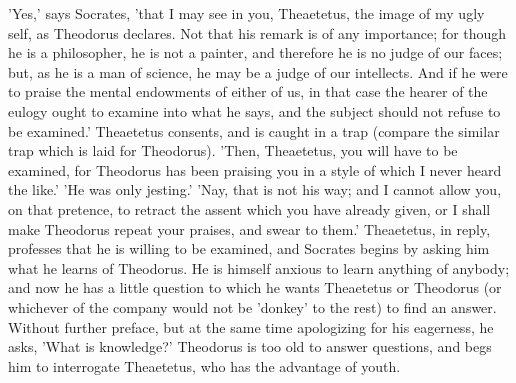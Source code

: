 'Yes,' says Socrates, 'that I may see in you, Theaetetus, the image
of my ugly self, as Theodorus declares. Not that his remark is of any
importance; for though he is a philosopher, he is not a painter, and
therefore he is no judge of our faces; but, as he is a man of science,
he may be a judge of our intellects. And if he were to praise the mental
endowments of either of us, in that case the hearer of the eulogy ought
to examine into what he says, and the subject should not refuse to be
examined.' Theaetetus consents, and is caught in a trap (compare the
similar trap which is laid for Theodorus). 'Then, Theaetetus, you will
have to be examined, for Theodorus has been praising you in a style of
which I never heard the like.' 'He was only jesting.' 'Nay, that is not
his way; and I cannot allow you, on that pretence, to retract the assent
which you have already given, or I shall make Theodorus repeat your
praises, and swear to them.' Theaetetus, in reply, professes that he is
willing to be examined, and Socrates begins by asking him what he learns
of Theodorus. He is himself anxious to learn anything of anybody; and
now he has a little question to which he wants Theaetetus or Theodorus
(or whichever of the company would not be 'donkey' to the rest) to find
an answer. Without further preface, but at the same time apologizing
for his eagerness, he asks, 'What is knowledge?' Theodorus is too old
to answer questions, and begs him to interrogate Theaetetus, who has the
advantage of youth.

